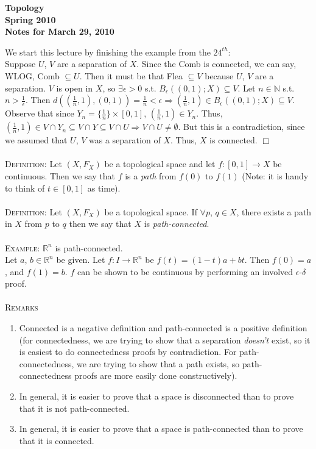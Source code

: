 \documentclass[12pt]{article}
\begin{document}
\begin{center}
	\bf
	Topology \\
	Spring 2010 \\
	\rm
	Notes for March 29, 2010 \\
\end{center}

We start this lecture by finishing the example from the $24^{th}$:
\\Suppose $U$, $V$ are a separation of $X$. Since the Comb is connected, we can say, WLOG, Comb $\subseteq U$. Then it must be that Flea $\subseteq V$ because $U$, $V$ are a separation. $V$ is open in $X$, so $\exists \epsilon > 0$ s.t. $B_{\epsilon}((0,1); X) \subseteq V$. Let $n \in \mathbb{N}$ s.t. $n > \frac{1}{\epsilon}$. Then $d((\frac{1}{n}, 1), (0, 1)) = \frac{1}{n} < \epsilon \Rightarrow (\frac{1}{n}, 1) \in B_{\epsilon}((0,1); X) \subseteq V$. Observe that since $Y_n = \{\frac{1}{n}\} \times [0,1]$,  $(\frac{1}{n}, 1) \in Y_n$. Thus, $(\frac{1}{n}, 1) \in V \cap Y_n \subseteq V \cap Y \subseteq V \cap U \Rightarrow V \cap U \neq \emptyset$. But this is a contradiction, since we assumed that $U$, $V$ was a separation of $X$. Thus, $X$ is connected. $\Box$
\\ \\ \textsc{Definition:} Let $(X, F_X)$ be a topological space and let $f:[0,1] \rightarrow X$ be continuous. Then we say that $f$ is a \emph{path} from $f(0)$ to $f(1)$ (Note: it is handy to think of $t \in [0,1]$ as time).
\\ \\ \textsc{Definition:} Let $(X, F_X)$ be a topological space. If $\forall p$, $q \in X$, there exists a path in $X$ from $p$ to $q$ then we say that $X$ is \emph{path-connected}.
\\ \\ \textsc{Example:} $\mathbb{R}^n$ is path-connected.
\\ Let $a$, $b \in \mathbb{R}^n$ be given. Let $f: I \rightarrow \mathbb{R}^n$ be $f(t) = (1-t)a + bt$. Then $f(0) = a$, and $f(1) = b$. $f$ can be shown to be continuous by performing an involved $\epsilon$-$\delta$ proof.
\\ \\ \textsc{Remarks}
\begin{enumerate}
\item Connected is a negative definition and path-connected is a positive definition (for connectedness, we are trying to show that a separation \emph{doesn't} exist, so it is easiest to do connectedness proofs by contradiction. For path-connectedness, we are trying to show that a path exists, so path-connectedness proofs are more easily done constructively).
\item In general, it is easier to prove that a space is disconnected than to prove that it is not path-connected.
\item In general, it is easier to prove that a space is path-connected than to prove that it is connected.
\end{enumerate}
\end{document}
